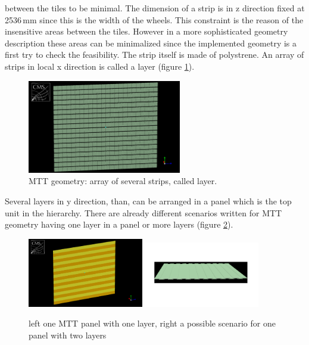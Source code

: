 			between the tiles to be minimal.
			The dimension of a strip is in z direction fixed at 2536\,mm since this is the width of the wheels.
			This constraint is the reason of the insensitive areas between the tiles.
			However in a more sophisticated geometry description these areas can be minimalized since the implemented geometry is a first try to check the feasibility. 
			The strip itself is made of polystrene.
			An array of strips in local x direction is called a layer (figure \ref{fig:layer}).
			\begin{figure}[htbp]
				\centering
				\includegraphics[width=0.6\textwidth]{Figures/erdogan/layer.png}
				\caption{MTT geometry: array of several strips, called layer.}
				\label{fig:layer}
			\end{figure}
			Several layers in y direction, than, can be arranged in a panel which is the top unit in the hierarchy.
			There are already different scenarios written for MTT geometry having one layer in a panel or more layers (figure \ref{fig:panel}).
			\begin{figure}[htbp]
				\centering
				\includegraphics[width=0.45\textwidth]{Figures/erdogan/panel1.png}
				\includegraphics[width=0.45\textwidth]{Figures/erdogan/panel2.png}
				\caption{left one MTT panel with one layer, right a possible scenario for one panel with two layers}
				\label{fig:panel}
			\end{figure}
